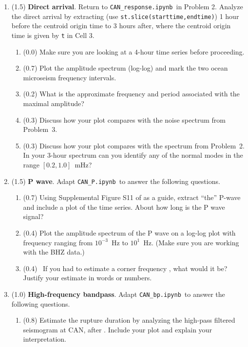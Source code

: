 \documentclass[11pt,titlepage,fleqn]{article}
\newcommand{\tfileresponse}{{\tt CAN\_response.ipynb}}
\newcommand{\tfileP}{{\tt CAN\_P.ipynb}}
\newcommand{\tfilebp}{{\tt CAN\_bp.ipynb}}
\begin{document}
\begin{enumerate}
\item (1.5) {\bf Direct arrival}. 
Return to \tfileresponse\ in Problem 2.
Analyze the direct arrival by extracting (use \verb+st.slice(starttime,endtime)+) 1 hour before the centroid origin time to 3 hours after, where the centroid origin time is given by \verb+t+ in Cell 3.

\begin{enumerate}
\item (0.0) Make sure you are looking at a 4-hour time series before proceeding.
\item (0.7) Plot the amplitude spectrum (log-log) and mark the two ocean microseism frequency intervals.
\item (0.2) What is the approximate frequency and period associated with the maximal amplitude?
\item (0.3) Discuss how your plot compares with the noise spectrum from Problem~3.
\item (0.3) Discuss how your plot compares with the spectrum from Problem~2. \\
In your 3-hour spectrum can you identify any of the normal modes in the range $[0.2,1.0]$~mHz?
\end{enumerate}


\item (1.5) {\bf P wave}. Adapt \tfileP\ to answer the following questions.
%
\begin{enumerate}
\item (0.7) Using Supplemental Figure S11 of \citet{Ammon2005} as a guide, extract ``the'' P-wave and include a plot of the time series. About how long is the P wave signal?
\item (0.4) Plot the amplitude spectrum of the P wave on a log-log plot with frequency ranging from $10^{-3}$~Hz to $10^1$~Hz. (Make sure you are working with the BHZ data.)

\item (0.4) \ptag\ If you had to estimate a corner frequency \citep[][p.~267]{SteinWysession}, what would it be? Justify your estimate in words or numbers.
\end{enumerate}


\item (1.0) {\bf High-frequency bandpass}. Adapt \tfilebp\ to answer the following questions.
%
\begin{enumerate}
\item (0.8) Estimate the rupture duration by analyzing the high-pass filtered seismogram at CAN, after \citet{Ni2005}. Include your plot and explain your interpretation.


\end{enumerate}
\end{enumerate}
\end{document}
